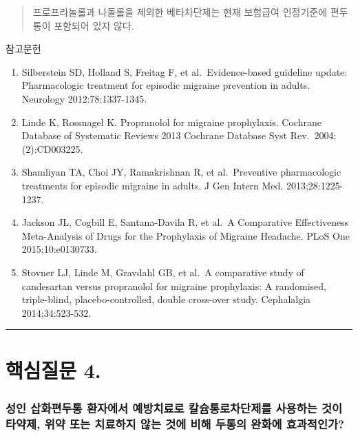 \documentclass[]{book}
\begin{document}
\begin{quote}
프로프라놀롤과 나돌롤을 제외한 베타차단제는 현재 보험급여 인정기준에 편두통이 포함되어 있지 않다.
\end{quote}

참고문헌

\begin{enumerate}
\def\labelenumi{\arabic{enumi}.}
\item
  Silberstein SD, Holland S, Freitag F, et al.~Evidence-based guideline update: Pharmacologic treatment for episodic migraine prevention in adults. Neurology 2012:78:1337-1345.
\item
  Linde K, Rossnagel K. Propranolol for migraine prophylaxis. Cochrane Database of Systematic Reviews 2013 Cochrane Database Syst Rev.~2004;(2):CD003225.
\item
  Shamliyan TA, Choi JY, Ramakrishnan R, et al.~Preventive pharmacologic treatments for episodic migraine in adults. J Gen Intern Med. 2013;28:1225-1237.
\item
  Jackson JL, Cogbill E, Santana-Davila R, et al.~A Comparative Effectiveness Meta-Analysis of Drugs for the Prophylaxis of Migraine Headache. PLoS One 2015;10:e0130733.
\item
  Stovner LJ, Linde M, Gravdahl GB, et al.~A comparative study of candesartan versus propranolol for migraine prophylaxis: A randomised, triple-blind, placebo-controlled, double cross-over study. Cephalalgia 2014;34:523-532.
\end{enumerate}

\begin{center}\rule{0.5\linewidth}{\linethickness}\end{center}

\hypertarget{section-15}{%
\section{핵심질문 4.}\label{section-15}}

\hypertarget{section-16}{%
\subsubsection*{성인 삽화편두통 환자에서 예방치료로 칼슘통로차단제를 사용하는 것이 타약제, 위약 또는 치료하지 않는 것에 비해 두통의 완화에 효과적인가?}\label{section-16}}
\end{document}
